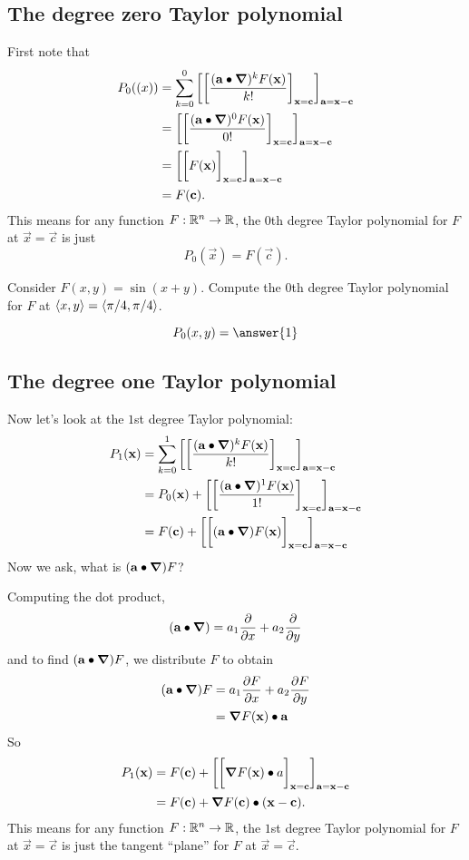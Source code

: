 \documentclass{ximera}
\begin{document}
\subsection{The degree zero Taylor polynomial}
First note that
\begin{align*}
  P_0(\vec(x)) &= \sum_{k=0}^0 \eval{\eval{\frac{(\vec{a}\dotp \grad)^k F(\vec{x})}{k!}}_{\vec{x}=\vec{c}}}_{\vec{a}=\vec{x}-\vec{c}}\\
  &=\eval{\eval{\frac{(\vec{a}\dotp \grad)^0 F(\vec{x})}{0!}}_{\vec{x}=\vec{c}}}_{\vec{a}=\vec{x}-\vec{c}}\\
  &=\eval{\eval{F(\vec{x})}_{\vec{x}=\vec{c}}}_{\vec{a}=\vec{x}-\vec{c}}\\
  &=F(\vec{c}).
\end{align*}
This means for any function $F:\R^n\to\R$, the $0$th degree Taylor
polynomial for $F$ at $\vec{x}=\vec{c}$ is just
\[
P_0(\vec{x})=F(\vec{c}).
\]
\begin{question}
  Consider $F(x,y)= \sin(x+y)$. Compute the $0$th degree Taylor
  polynomial for $F$ at $\vector{x,y} =\vector{\pi/4,\pi/4}$.
  \begin{prompt}
    \[
    P_0(x,y) = \answer{1}
    \]
  \end{prompt}
\end{question}

\subsection{The  degree one Taylor polynomial}
Now let's look at the $1$st degree Taylor polynomial:
\begin{align*}
  P_1(\vec{x})&= \sum_{k=0}^1 \eval{\eval{\frac{(\vec{a}\dotp \grad)^k F(\vec{x})}{k!}}_{\vec{x}=\vec{c}}}_{\vec{a}=\vec{x}-\vec{c}}\\
  &=P_0(\vec{x}) + \eval{\eval{\frac{(\vec{a}\dotp \grad)^1 F(\vec{x})}{1!}}_{\vec{x}=\vec{c}}}_{\vec{a}=\vec{x}-\vec{c}}\\
  &=F(\vec{c}) + \eval{\eval{(\vec{a}\dotp \grad) F(\vec{x})}_{\vec{x}=\vec{c}}}_{\vec{a}=\vec{x}-\vec{c}}
\end{align*}
Now we ask, what is $(\vec{a}\dotp\grad)F$?

Computing the dot product, 
\[
(\vec{a}\dotp\grad) = a_1 \pp{x} + a_2 \pp{y}
\]
and to find $(\vec{a}\dotp\grad)F$, we distribute $F$ to obtain
\begin{align*}
  (\vec{a}\dotp\grad)F &= a_1 \pp[F]{x} + a_2 \pp[F]{y}\\
  &= \grad F(\vec{x})\dotp \vec{a}
\end{align*}
So
\begin{align*}
  P_1(\vec{x})&=F(\vec{c}) + \eval{\eval{\grad F(\vec{x})\dotp{a}}_{\vec{x}=\vec{c}}}_{\vec{a}=\vec{x}-\vec{c}}\\
  &=F(\vec{c}) +\grad F(\vec{c})\dotp (\vec{x}-\vec{c}).
\end{align*}
This means for any function $F:\R^n\to\R$, the $1$st degree Taylor
polynomial for $F$ at $\vec{x}=\vec{c}$ is just the tangent ``plane''
for $F$ at $\vec{x}= \vec{c}$.
\end{document}
